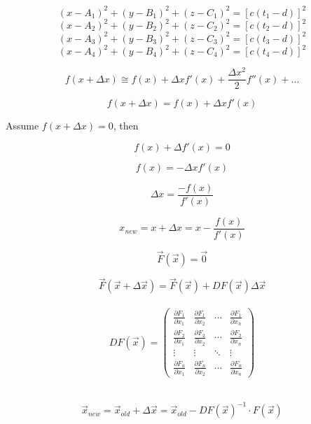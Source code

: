 \documentclass[11pt]{amsart}
\theoremstyle{remark}
\begin{document}
$$(x-A_1)^2+(y-B_1)^2+(z-C_1)^2=[c(t_1-d)]^2$$
$$(x-A_2)^2+(y-B_2)^2+(z-C_2)^2=[c(t_2-d)]^2$$
$$(x-A_3)^2+(y-B_3)^2+(z-C_3)^2=[c(t_3-d)]^2$$
$$(x-A_4)^2+(y-B_4)^2+(z-C_4)^2=[c(t_4-d)]^2$$

\vspace{1cm}
$$f(x+\Delta x)\cong f(x) + \Delta x f'(x) + \frac{\Delta x^2}{2} f'' (x) + ...$$


\vspace{1cm}

$$f(x+\Delta x) = f(x) + \Delta x f'(x)$$
\vspace{0cm}
\begin{center}
Assume $f(x+\Delta x)=0$, then
\end{center}

$$f(x)+\Delta f'(x)=0$$

$$f(x)=- \Delta x f'(x)$$

$$\Delta x = \frac{-f(x)}{f'(x)}$$

$$x_{new}=x+\Delta x=x-\frac{f(x)}{f'(x)}$$

\vspace{1cm}

$$\overrightarrow{F}(\overrightarrow{x})=\overrightarrow{0}$$

$$\overrightarrow{F}(\overrightarrow{x}+\Delta \overrightarrow{x})=\overrightarrow{F}(\overrightarrow{x})+DF(\overrightarrow{x})\Delta \overrightarrow{x}$$\\


\begin{equation} DF(\overrightarrow{x}) =  \begin{pmatrix}
\frac{\partial F_1}{\partial x_1} & \frac{\partial F_1}{\partial x_2} & \cdots & \frac{\partial F_1}{\partial x_n} \\
\frac{\partial F_2}{\partial x_1} & \frac{\partial F_2}{\partial x_2} & \cdots & \frac{\partial F_2}{\partial x_n} \\
\vdots  & \vdots  & \ddots & \vdots \\
\frac{\partial F_n}{\partial x_1} & \frac{\partial F_n}{\partial x_2} & \cdots & \frac{\partial F_n}{\partial x_n} \end{pmatrix} \end{equation}\\

\vspace{1cm}

$$\overrightarrow{x}_{new}=\overrightarrow{x}_{old} +\Delta \overrightarrow{x} = \overrightarrow{x}_{old} - DF(\overrightarrow{x})^{-1} \cdot F(\overrightarrow{x}) $$
\end{document}
